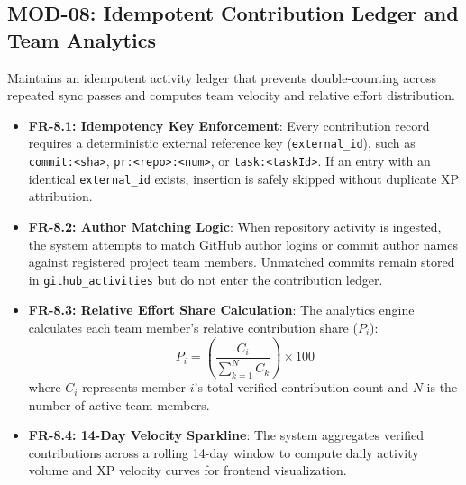 \documentclass{scrreprt}
\begin{document}
\subsection{MOD-08: Idempotent Contribution Ledger and Team Analytics}
Maintains an idempotent activity ledger that prevents double-counting across repeated sync passes and computes team velocity and relative effort distribution.
\begin{itemize}
    \item \textbf{FR-8.1: Idempotency Key Enforcement}: Every contribution record requires a deterministic external reference key (\texttt{external\_id}), such as \texttt{commit:<sha>}, \texttt{pr:<repo>:<num>}, or \texttt{task:<taskId>}. If an entry with an identical \texttt{external\_id} exists, insertion is safely skipped without duplicate XP attribution.
    \item \textbf{FR-8.2: Author Matching Logic}: When repository activity is ingested, the system attempts to match GitHub author logins or commit author names against registered project team members. Unmatched commits remain stored in \texttt{github\_activities} but do not enter the contribution ledger.
    \item \textbf{FR-8.3: Relative Effort Share Calculation}: The analytics engine calculates each team member's relative contribution share ($P_i$):
    \begin{equation}
        P_i = \left( \frac{C_i}{\sum_{k=1}^N C_k} \right) \times 100
    \end{equation}
    where $C_i$ represents member $i$'s total verified contribution count and $N$ is the number of active team members.
    \item \textbf{FR-8.4: 14-Day Velocity Sparkline}: The system aggregates verified contributions across a rolling 14-day window to compute daily activity volume and XP velocity curves for frontend visualization.
\end{itemize}
\end{document}
